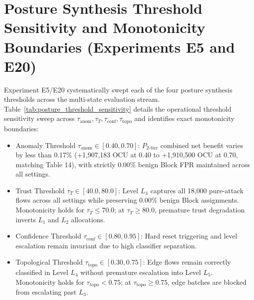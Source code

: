 \section{Posture Synthesis Threshold Sensitivity and Monotonicity Boundaries (Experiments E5 and E20)}
\label{app:threshold_sensitivity}

Experiment E5/E20 systematically swept each of the four posture synthesis thresholds across the multi-state evaluation stream. Table~\ref{tab:posture_threshold_sensitivity} details the operational threshold sensitivity sweep across $\tau_{\text{anom}}, \tau_T, \tau_{\text{conf}}, \tau_{\text{topo}}$ and identifies exact monotonicity boundaries:
\begin{itemize}
  \item Anomaly Threshold $\tau_{\text{anom}} \in [0.40, 0.70]$: $P_{2\text{-tier}}$ combined net benefit varies by less than 0.17\% (+1,907,183 OCU at 0.40 to +1,910,500 OCU at 0.70, matching Table 14), with strictly 0.00\% benign Block FPR maintained across all settings.
  \item Trust Threshold $\tau_T \in [40.0, 80.0]$: Level $L_4$ captures all 18,000 pure-attack flows across all settings while preserving 0.00\% benign Block assignments. Monotonicity holds for $\tau_T \le 70.0$; at $\tau_T \ge 80.0$, premature trust degradation inverts $L_1$ and $L_2$ allocations.
  \item Confidence Threshold $\tau_{\text{conf}} \in [0.80, 0.95]$: Hard reset triggering and level escalation remain invariant due to high classifier separation.
  \item Topological Threshold $\tau_{\text{topo}} \in [0.30, 0.75]$: Edge flows remain correctly classified in Level $L_4$ without premature escalation into Level $L_5$. Monotonicity holds for $\tau_{\text{topo}} < 0.75$; at $\tau_{\text{topo}} \ge 0.75$, edge batches are blocked from escalating past $L_3$.
\end{itemize}

